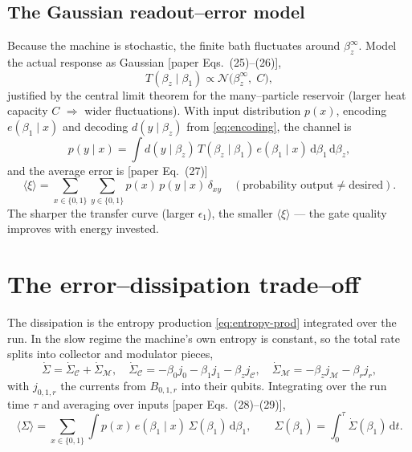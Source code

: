 \documentclass[11pt,a4paper]{article}
\renewcommand{\dd}{\mathrm{d}}
\newcommand{\calC}{\mathcal{C}}
\newcommand{\calM}{\mathcal{M}}
\theoremstyle{definition}
\theoremstyle{remark}
\begin{document}
\subsection{The Gaussian readout--error model}
Because the machine is stochastic, the finite bath fluctuates around
$\beta_z^\infty$. Model the actual response as Gaussian [paper
Eqs.~(25)--(26)],
\begin{equation}
T(\beta_z\mid\beta_1)\propto \mathcal N\big(\beta_z^\infty,\;C\big),
\end{equation}
justified by the central limit theorem for the many--particle reservoir
(larger heat capacity $C$ $\Rightarrow$ wider fluctuations). With input
distribution $p(x)$, encoding $e(\beta_1\mid x)$ and decoding
$d(y\mid\beta_z)$ from \eqref{eq:encoding}, the channel is
\begin{equation}
p(y\mid x)=\int d(y\mid\beta_z)\,T(\beta_z\mid\beta_1)\,
e(\beta_1\mid x)\,\dd\beta_1\,\dd\beta_z,
\end{equation}
and the average error is [paper Eq.~(27)]
\begin{equation}
\langle\xi\rangle=\sum_{x\in\{0,1\}}\sum_{y\in\{0,1\}}
p(x)\,p(y\mid x)\,\delta_{xy}
\quad(\text{probability output}\neq\text{desired}).
\label{eq:error}
\end{equation}
The sharper the transfer curve (larger $\epsilon_1$), the smaller
$\langle\xi\rangle$ --- the gate quality improves with energy invested.

\section{The error--dissipation trade--off}
\label{sec:tradeoff}
The dissipation is the entropy production \eqref{eq:entropy-prod}
integrated over the run. In the slow regime the machine's own entropy is
constant, so the total rate splits into collector and modulator pieces,
\begin{equation}
\dot\Sigma=\dot\Sigma_{\calC}+\dot\Sigma_\calM,\quad
\dot\Sigma_{\calC}=-\beta_0 j_0-\beta_1 j_1-\beta_z j_{\calC},\quad
\dot\Sigma_\calM=-\beta_z j_\calM-\beta_r j_r,
\end{equation}
with $j_{0,1,r}$ the currents from $B_{0,1,r}$ into their qubits.
Integrating over the run time $\tau$ and averaging over inputs [paper
Eqs.~(28)--(29)],
\begin{equation}
\langle\Sigma\rangle=\sum_{x\in\{0,1\}}\int p(x)\,e(\beta_1\mid x)\,
\Sigma(\beta_1)\,\dd\beta_1,\qquad
\Sigma(\beta_1)=\int_0^\tau\dot\Sigma(\beta_1)\,\dd t.
\label{eq:diss}
\end{equation}
\end{document}
